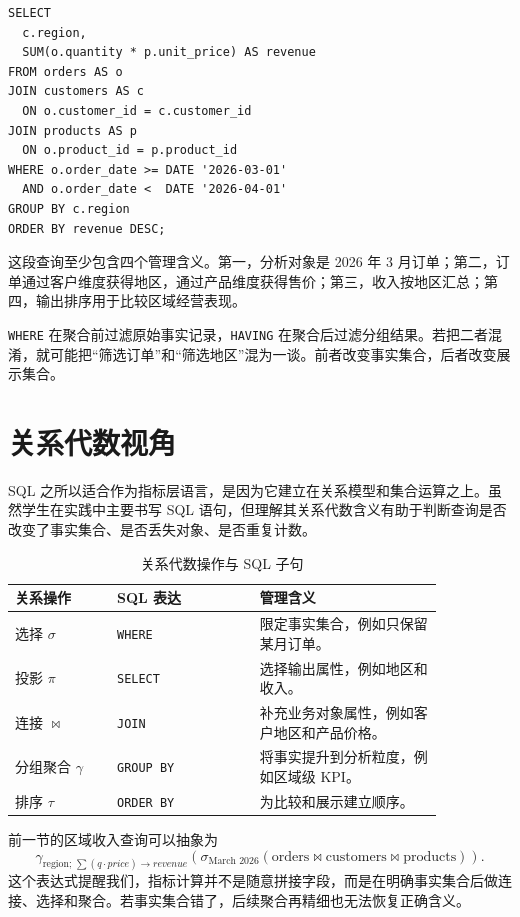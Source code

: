 \documentclass[UTF8,fontset=fandol,openany,zihao=-4]{ctexbook}
\begin{document}
\begin{lstlisting}[caption={区域销售额查询}]
SELECT
  c.region,
  SUM(o.quantity * p.unit_price) AS revenue
FROM orders AS o
JOIN customers AS c
  ON o.customer_id = c.customer_id
JOIN products AS p
  ON o.product_id = p.product_id
WHERE o.order_date >= DATE '2026-03-01'
  AND o.order_date <  DATE '2026-04-01'
GROUP BY c.region
ORDER BY revenue DESC;
\end{lstlisting}

这段查询至少包含四个管理含义。第一，分析对象是 2026 年 3 月订单；第二，订单通过客户维度获得地区，通过产品维度获得售价；第三，收入按地区汇总；第四，输出排序用于比较区域经营表现。

\begin{remark}
\texttt{WHERE} 在聚合前过滤原始事实记录，\texttt{HAVING} 在聚合后过滤分组结果。若把二者混淆，就可能把“筛选订单”和“筛选地区”混为一谈。前者改变事实集合，后者改变展示集合。
\end{remark}

\section{关系代数视角}

SQL 之所以适合作为指标层语言，是因为它建立在关系模型和集合运算之上。虽然学生在实践中主要书写 SQL 语句，但理解其关系代数含义有助于判断查询是否改变了事实集合、是否丢失对象、是否重复计数。

\begin{table}[htbp]
\centering
\caption{关系代数操作与 SQL 子句}
\begin{tabular}{p{0.20\linewidth}p{0.29\linewidth}p{0.36\linewidth}}
\toprule
关系操作 & SQL 表达 & 管理含义\\
\midrule
选择 \(\sigma\) & \texttt{WHERE} & 限定事实集合，例如只保留某月订单。\\
投影 \(\pi\) & \texttt{SELECT} & 选择输出属性，例如地区和收入。\\
连接 \(\Join\) & \texttt{JOIN} & 补充业务对象属性，例如客户地区和产品价格。\\
分组聚合 \(\gamma\) & \texttt{GROUP BY} & 将事实提升到分析粒度，例如区域级 KPI。\\
排序 \(\tau\) & \texttt{ORDER BY} & 为比较和展示建立顺序。\\
\bottomrule
\end{tabular}
\end{table}

前一节的区域收入查询可以抽象为
\[
\gamma_{\text{region};\, \sum(q\cdot price)\rightarrow revenue}
\left(
\sigma_{\text{March 2026}}
(\text{orders}\Join \text{customers}\Join \text{products})
\right).
\]
这个表达式提醒我们，指标计算并不是随意拼接字段，而是在明确事实集合后做连接、选择和聚合。若事实集合错了，后续聚合再精细也无法恢复正确含义。
\end{document}
